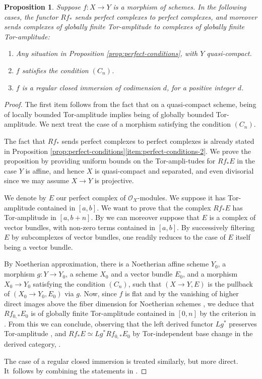 \documentclass[JEP,XML,SOM,Unicode,published]{cedram}
\theoremstyle{plain}
\newtheorem{proposition}[theorem]{Proposition}
\theoremstyle{definition}
\newcommand{\Ocal}{\mathcal O}
\begin{document}
\begin{proposition}
Suppose $f: X\to Y$ is a morphism of schemes. In the following cases, the functor $Rf_\ast$ sends perfect complexes to perfect complexes, and moreover sends complexes of globally finite Tor-amplitude to complexes of globally finite Tor-amplitude:
\begin{enumerate}
\item Any situation in Proposition \ref{prop:perfect-conditions}, with $Y$ quasi-compact.
\item $f$ satisfies the condition $(C_n)$.
\item $f$ is a regular closed immersion of codimension $d$, for a positive integer $d$.
\end{enumerate}
\end{proposition}
\begin{proof}
The first item follows from the fact that on a quasi-compact scheme, being of locally bounded Tor-amplitude implies being of globally bounded Tor-amplitude. We next treat the case of a morphism satisfying the condition $(C_n)$.

The fact that $Rf_\ast$ sends perfect complexes to perfect complexes is already stated in Proposition \ref{prop:perfect-conditions}\eqref{item:perfect-conditions-2}. We prove the proposition by providing uniform bounds on the Tor-ampli\--tudes for $Rf_\ast E$ in the case $Y$ is affine, and hence $X$ is quasi-compact and separated, and even divisorial since we may assume $X\to Y$ is projective.

We denote by $E$ our perfect complex of $\Ocal_X$-modules. We suppose it has Tor-amplitude contained in $[a,b]$. We want to prove that the complex $Rf_{\ast}E$ has Tor-amplitude in $[a,b+n]$. By \cite[Th.\,2.4.3]{ThomasonTrobaugh} we can moreover suppose that $E$ is a complex of vector bundles, with non-zero terms contained in $[a,b]$. By successively filtering $E$ by subcomplexes of vector bundles, one readily reduces to the case of $E$ itself being a vector bundle.

By Noetherian approximation, there is a Noetherian affine scheme $Y_0$, a morphism $g: Y\to Y_0$, a scheme $X_0$ and a vector bundle $E_0$, and a morphism $X_0 \to Y_0$ satisfying the condition $(C_n)$, such that $(X\to Y, E)$ is the pullback of $(X_0 \to Y_0, E_0)$ via $g$. Now, since $f$ is flat and by the vanishing of higher direct images above the fiber dimension for Noetherian schemes \cite[\href{https://stacks.math.columbia.edu/tag/02V7}{02V7}]{stacks-project}, we deduce that $Rf_{0, \ast} E_0$ is of globally finite Tor-amplitude contained in $[0,n]$ by the criterion in \cite[III, Cor.\,3.7.1]{SGA6}. From this we can conclude, observing that the left derived functor $Lg^\ast$ preserves Tor-amplitude \hbox{\cite[III, Cor.\,3.5.2]{SGA6}}, and $Rf_\ast E \simeq Lg^\ast Rf_{0, \ast} E_0$ by Tor-independent base change in the derived category, \cf \cite[\href{https://stacks.math.columbia.edu/tag/08IB}{08IB}]{stacks-project}.

The case of a regular closed immersion is treated similarly, but more direct. It~follows by combining the statements in \cite[Ex.\,4.1.1, Prop.\,4.4, Cor.\,4.5.1]{SGA6}.
\end{proof}
\end{document}
